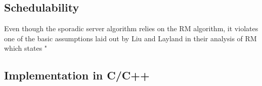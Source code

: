 \documentclass[conference]{IEEEtran}
\begin{document}
\subsection{Schedulability}
Even though the sporadic server algorithm relies on the RM algorithm, it violates one of the basic assumptions laid out by Liu and Layland in their analysis of RM\cite{schedulingformula} which states "
\subsection{Implementation in C/C++}
 

\end{document}

